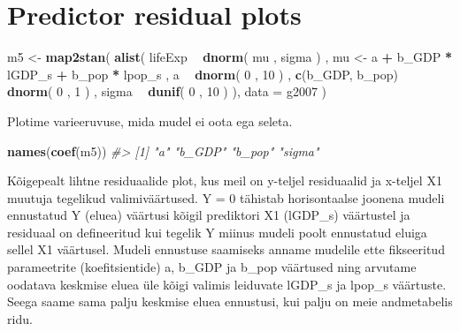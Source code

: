 \documentclass[]{book}
\newenvironment{Shaded}{\begin{snugshade}}{\end{snugshade}}
\newcommand{\KeywordTok}[1]{\textcolor[rgb]{0.13,0.29,0.53}{\textbf{#1}}}
\newcommand{\DataTypeTok}[1]{\textcolor[rgb]{0.13,0.29,0.53}{#1}}
\newcommand{\DecValTok}[1]{\textcolor[rgb]{0.00,0.00,0.81}{#1}}
\newcommand{\StringTok}[1]{\textcolor[rgb]{0.31,0.60,0.02}{#1}}
\newcommand{\CommentTok}[1]{\textcolor[rgb]{0.56,0.35,0.01}{\textit{#1}}}
\newcommand{\OperatorTok}[1]{\textcolor[rgb]{0.81,0.36,0.00}{\textbf{#1}}}
\newcommand{\NormalTok}[1]{#1}
\begin{document}
\section*{Predictor residual plots}\label{predictor-residual-plots}

\begin{Shaded}
\begin{Highlighting}[]
\NormalTok{m5 <-}\StringTok{ }\KeywordTok{map2stan}\NormalTok{(}
    \KeywordTok{alist}\NormalTok{(}
\NormalTok{        lifeExp }\OperatorTok{~}\StringTok{ }\KeywordTok{dnorm}\NormalTok{( mu , sigma ) ,}
\NormalTok{        mu <-}\StringTok{ }\NormalTok{a }\OperatorTok{+}\StringTok{ }\NormalTok{b_GDP }\OperatorTok{*}\StringTok{ }\NormalTok{lGDP_s }\OperatorTok{+}\StringTok{ }\NormalTok{b_pop }\OperatorTok{*}\StringTok{ }\NormalTok{lpop_s ,}
\NormalTok{        a }\OperatorTok{~}\StringTok{ }\KeywordTok{dnorm}\NormalTok{( }\DecValTok{0}\NormalTok{ , }\DecValTok{10}\NormalTok{ ) ,}
        \KeywordTok{c}\NormalTok{(b_GDP, b_pop) }\OperatorTok{~}\StringTok{ }\KeywordTok{dnorm}\NormalTok{( }\DecValTok{0}\NormalTok{ , }\DecValTok{1}\NormalTok{ ) ,}
\NormalTok{        sigma }\OperatorTok{~}\StringTok{ }\KeywordTok{dunif}\NormalTok{( }\DecValTok{0}\NormalTok{ , }\DecValTok{10}\NormalTok{ )}
\NormalTok{), }\DataTypeTok{data =}\NormalTok{ g2007 )}
\end{Highlighting}
\end{Shaded}

Plotime varieeruvuse, mida mudel ei oota ega seleta.

\begin{Shaded}
\begin{Highlighting}[]
\KeywordTok{names}\NormalTok{(}\KeywordTok{coef}\NormalTok{(m5))}
\CommentTok{#> [1] "a"     "b_GDP" "b_pop" "sigma"}
\end{Highlighting}
\end{Shaded}

Kõigepealt lihtne residuaalide plot, kus meil on y-teljel residuaalid ja
x-teljel X1 muutuja tegelikud valimiväärtused. Y = 0 tähistab
horisontaalse joonena mudeli ennustatud Y (eluea) väärtusi kõigil
prediktori X1 (lGDP\_s) väärtustel ja residuaal on defineeritud kui
tegelik Y miinus mudeli poolt ennustatud eluiga sellel X1 väärtusel.
Mudeli ennustuse saamiseks anname mudelile ette fikseeritud parameetrite
(koefitsientide) a, b\_GDP ja b\_pop väärtused ning arvutame oodatava
keskmise eluea üle kõigi valimis leiduvate lGDP\_s ja lpop\_s väärtuste.
Seega saame sama palju keskmise eluea ennustusi, kui palju on meie
andmetabelis ridu.
\end{document}
